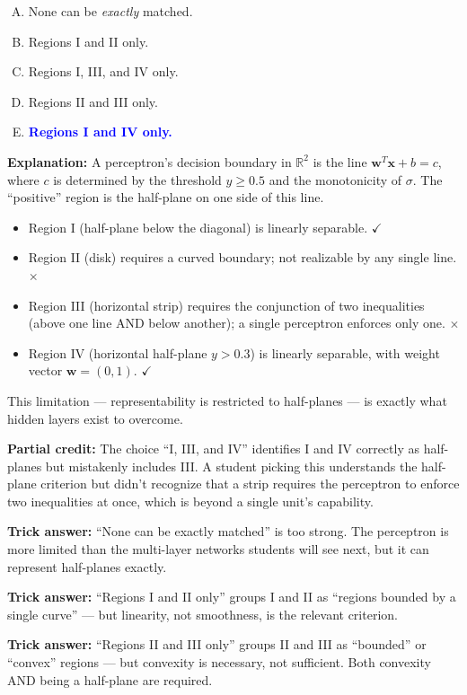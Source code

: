 \documentclass[12pt]{amsart}
\begin{document}
\begin{enumerate}[(A)]
\item None can be \emph{exactly} matched.
\item Regions I and II only.
\item Regions I, III, and IV only.
\item Regions II and III only.
\item \textcolor{blue}{\textbf{Regions I and IV only.}}
\end{enumerate}

\textbf{Explanation:}
A perceptron's decision boundary in $\mathbb{R}^2$ is the line
$\mathbf{w}^T\mathbf{x} + b = c$, where $c$ is determined by the threshold
$y \geq 0.5$ and the monotonicity of $\sigma$. The ``positive'' region is the
half-plane on one side of this line.
\begin{itemize}
\item Region I (half-plane below the diagonal) is linearly separable. $\checkmark$
\item Region II (disk) requires a curved boundary; not realizable by any
single line. $\times$
\item Region III (horizontal strip) requires the conjunction of two
inequalities (above one line AND below another); a single perceptron
enforces only one. $\times$
\item Region IV (horizontal half-plane $y > 0.3$) is linearly separable,
with weight vector $\mathbf{w} = (0, 1)$. $\checkmark$
\end{itemize}
This limitation --- representability is restricted to half-planes --- is
exactly what hidden layers exist to overcome.

\textbf{Partial credit:}
The choice ``I, III, and IV'' identifies I and IV correctly as half-planes
but mistakenly includes III. A student picking this understands the
half-plane criterion but didn't recognize that a strip requires the
perceptron to enforce two inequalities at once, which is beyond a single
unit's capability.

\textbf{Trick answer:}
``None can be exactly matched'' is too strong. The perceptron is more limited
than the multi-layer networks students will see next, but it can represent
half-planes exactly.

\textbf{Trick answer:}
``Regions I and II only'' groups I and II as ``regions bounded by a single
curve'' --- but linearity, not smoothness, is the relevant criterion.

\textbf{Trick answer:}
``Regions II and III only'' groups II and III as ``bounded'' or ``convex''
regions --- but convexity is necessary, not sufficient. Both convexity AND
being a half-plane are required.
\end{document}

